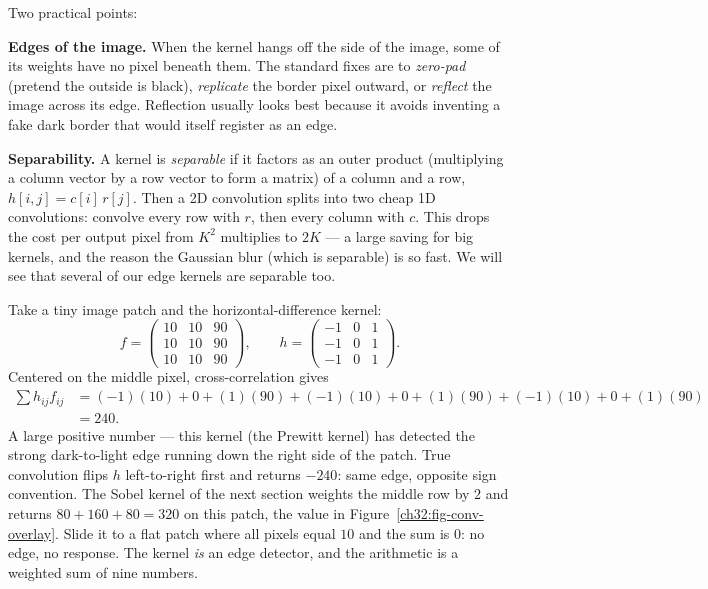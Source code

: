 Two practical points:

\textbf{Edges of the image.} When the kernel hangs off the side of the image,
some of its weights have no pixel beneath them. The standard fixes are to
\emph{zero-pad} (pretend the outside is black), \emph{replicate} the border
pixel outward, or \emph{reflect} the image across its edge. Reflection usually
looks best because it avoids inventing a fake dark border that would itself
register as an edge.

\textbf{Separability.} A kernel is \emph{separable} if it factors as an outer
product (multiplying a column vector by a row vector to form a matrix) of a column and a row, $h[i,j] = c[i]\,r[j]$. Then a 2D convolution
splits into two cheap 1D convolutions: convolve every row with $r$, then every
column with $c$. This drops the cost per output pixel from $K^2$ multiplies to
$2K$ --- a large saving for big kernels, and the reason the Gaussian blur (which
is separable) is so fast. We will see that several of our edge kernels are
separable too.

\begin{example}
\label{ch32:ex-byhand}
Take a tiny image patch and the horizontal-difference kernel:
\[
f = \begin{pmatrix} 10 & 10 & 90 \\ 10 & 10 & 90 \\ 10 & 10 & 90 \end{pmatrix},
\qquad
h = \begin{pmatrix} -1 & 0 & 1 \\ -1 & 0 & 1 \\ -1 & 0 & 1 \end{pmatrix}.
\]
Centered on the middle pixel, cross-correlation gives
\begin{align*}
\sum h_{ij} f_{ij}
&= (-1)(10) + 0 + (1)(90) + (-1)(10) + 0 + (1)(90) + (-1)(10) + 0 + (1)(90) \\
&= 240.
\end{align*}
A large positive number --- this kernel (the Prewitt kernel) has detected the
strong dark-to-light edge running down the right side of the patch. True
convolution flips $h$ left-to-right first and returns $-240$: same edge, opposite
sign convention. The Sobel kernel of the next section weights the middle row by
$2$ and returns $80+160+80 = 320$ on this patch, the value in
Figure~\ref{ch32:fig-conv-overlay}. Slide it to a flat patch where
all pixels equal $10$ and the sum is $0$: no edge, no response. The kernel
\emph{is} an edge detector, and the arithmetic is a weighted sum of nine
numbers.
\end{example}

